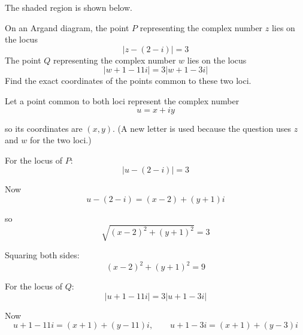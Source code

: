 \documentclass[leqno]{article}
\begin{document}
\begin{enumerate}[
  label=\textbf{\arabic*.},
  leftmargin=*,
  topsep=0pt,
  partopsep=0pt,
  parsep=0pt
]
\begin{djsSolution}
\begin{enumerate}[label=\textbf{(\alph*)}]
  The shaded region is shown below.

  \begin{center}
  \end{center}
\end{enumerate}
\end{djsSolution}


\newpage

\questionitem

On an Argand diagram, the point $P$ representing the complex number $z$ lies on the locus
\[
\lvert z-(2-i)\rvert =3
\]
The point $Q$ representing the complex number $w$ lies on the locus
\[
\lvert w+1-11i\rvert =3\lvert w+1-3i\rvert
\]
Find the exact coordinates of the points common to these two loci. 

\vspace*{10pt}

\begin{djsSolution}
Let a point common to both loci represent the complex number
\[
u=x+iy
\]

so its coordinates are \((x,y)\). (A new letter is used because the question uses \(z\) and \(w\) for the two loci.)

For the locus of \(P\):
\[
|u-(2-i)|=3
\]

Now
\[
u-(2-i)=(x-2)+(y+1)i
\]

so
\[
\sqrt{(x-2)^2+(y+1)^2}=3
\]

Squaring both sides:
\[
(x-2)^2+(y+1)^2=9
\]

For the locus of \(Q\):
\[
|u+1-11i|=3|u+1-3i|
\]

Now
\[
u+1-11i=(x+1)+(y-11)i,\qquad
u+1-3i=(x+1)+(y-3)i
\]


\end{djsSolution}
\end{enumerate}
\end{document}
